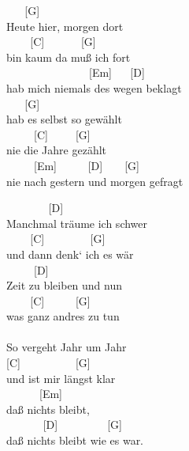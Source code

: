 \documentclass[
  letterpaper,
  twoside=false]{scrbook}
\begin{document}
~ ~ {[}G{]} ~ ~ ~ ~ ~ ~ ~ ~\\
Heute hier, morgen dort\\
\hspace*{0.333em} ~ ~ ~{[}C{]} ~ ~ ~ ~{[}G{]}\\
bin kaum da muß ich fort\\
\hspace*{0.333em} ~ ~ ~ ~ ~ ~ ~ ~ ~ {[}Em{]} ~ ~{[}D{]}\\
hab mich niemals des wegen beklagt\\
\hspace*{0.333em} ~ ~ {[}G{]} ~ ~ ~ ~ ~ ~ ~\\
hab es selbst so gewählt\\
\hspace*{0.333em} ~ ~ ~ {[}C{]} ~ ~ ~{[}G{]}\\
nie die Jahre gezählt\\
\hspace*{0.333em} ~ ~ ~ {[}Em{]} ~ ~ ~ {[}D{]} ~ ~ {[}G{]}\\
nie nach gestern und morgen gefragt

~ ~ ~ ~ ~{[}D{]} ~ ~ ~ ~ ~ ~ ~\\
Manchmal träume ich schwer\\
\hspace*{0.333em} ~ ~ ~{[}C{]} ~ ~ ~ ~ ~{[}G{]}\\
und dann denk` ich es wär\\
\hspace*{0.333em} ~ ~ ~ {[}D{]} ~ ~ ~ ~ ~ ~\\
Zeit zu bleiben und nun\\
\hspace*{0.333em} ~ ~ ~{[}C{]} ~ ~ ~ {[}G{]}\\
was ganz andres zu tun\\
\hspace*{0.333em} ~ ~ ~ ~ ~ ~ ~ ~ ~ ~ ~\\
So vergeht Jahr um Jahr\\
\hspace*{0.333em} {[}C{]} ~ ~ ~ ~ ~ ~{[}G{]}\\
und ist mir längst klar\\
\hspace*{0.333em} ~ ~ ~ ~{[}Em{]} ~ ~\\
daß nichts bleibt,\\
\hspace*{0.333em} ~ ~ ~ ~ {[}D{]} ~ ~ ~ ~ ~ {[}G{]}\\
daß nichts bleibt wie es war.
\end{document}
